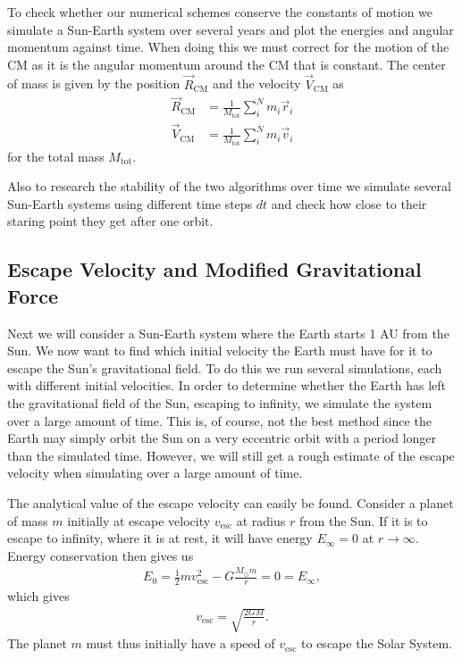 \documentclass[twocolumn]{aastex62}
\begin{document}
To check whether our numerical schemes conserve the constants of motion we
simulate a Sun-Earth system over several years and plot the energies and angular
momentum against time. When doing this we must correct for the motion of the CM
as it is the angular momentum around the CM that is constant. The center of mass
is given by the position $\vec{R}_\mathrm{CM}$ and the velocity
$\vec{V}_\mathrm{CM}$ as 
\begin{align}
    \vec{R}_\mathrm{CM} &= \frac{1}{M_\mathrm{tot}}\sum_i^N m_i \vec{r}_i\\
    \vec{V}_\mathrm{CM} &= \frac{1}{M_\mathrm{tot}}\sum_i^N m_i \vec{v}_i
\end{align}
for the total mass $M_\mathrm{tot}$.

Also to research the stability of the two algorithms over
time we simulate several Sun-Earth systems using different time steps $dt$ and
check how close to their staring point they get after one orbit. 

\subsection{Escape Velocity and Modified Gravitational Force}\label{sec:modgrav}
Next we will consider a Sun-Earth system where the Earth starts 1 AU from the
Sun. We now want to find which initial velocity the Earth must have for it to
escape the Sun's gravitational field. To do this we run several simulations,
each with different initial velocities. In order to determine whether the Earth
has left the gravitational field of the Sun, escaping to infinity, we
simulate the system over a large amount of time. This is, of course, not the
best method since the Earth may simply orbit the Sun on a very eccentric orbit
with a period longer than the simulated time. However, we will still get a
rough estimate of the escape velocity when simulating over a large amount of time.

The analytical value of the escape velocity can easily be found. Consider a
planet of mass $m$ initially at escape velocity $v_\mathrm{esc}$ at radius $r$
from the Sun. If it is to escape to infinity, where it is at rest, it will have
energy $E_\infty = 0$ at $r\to\infty$. Energy conservation then gives us 
\begin{align}
    E_0 = \frac{1}{2}mv_\mathrm{esc}^2 - G\frac{M_\odot m}{r} = 0 = E_\infty,
\end{align} 
which gives 
\begin{align}\label{eq:v_esc}
    v_\mathrm{esc} = \sqrt{\frac{2GM}{r}}.
\end{align}
The planet $m$ must thus initially have a speed of $v_\mathrm{esc}$ to escape the Solar System.
\end{document}
